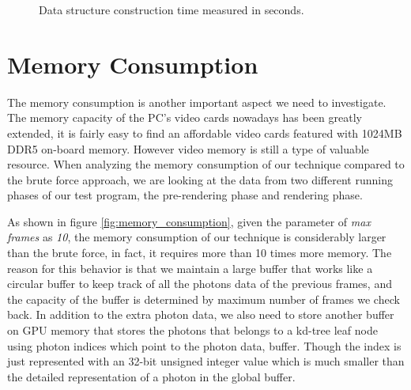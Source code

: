 \begin{figure}[ftp]
    \centering
    \renewcommand{\thefigure}{\thechapter.\arabic{figure}}
    \caption[Data construction time performance]{Data structure construction time measured in seconds. }
    \label{fig:construction_time}
\end{figure}

\section{Memory Consumption}

The memory consumption is another important aspect we need to investigate. The memory capacity of the PC's video cards nowadays has been greatly extended, it is fairly easy to find an affordable video cards featured with 1024MB DDR5 on-board memory. However video memory is still a type of valuable resource. When analyzing the memory consumption of our technique compared to the brute force approach, we are looking at the data from two different running phases of our test program, the pre-rendering phase and rendering phase.

As shown in figure \ref{fig:memory_consumption}, given the parameter of \emph{max frames} as \emph{10}, the memory consumption of our technique is considerably larger than the brute force, in fact, it requires more than 10 times more memory. The reason for this behavior is that we maintain a large buffer that works like a circular buffer to keep track of all the photons data of the previous frames, and the capacity of the buffer is determined by maximum number of frames we check back. In addition to the extra photon data, we also need to store another buffer on GPU memory that stores the photons that belongs to a kd-tree leaf node using photon indices which point to the photon data, buffer. Though the index is just represented with an 32-bit unsigned integer value which is much smaller than the detailed representation of a photon in the global buffer.

